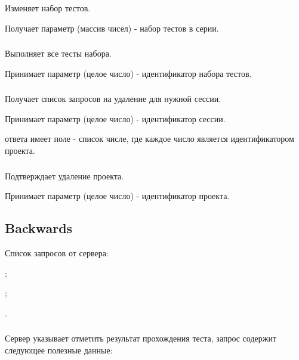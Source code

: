 Изменяет набор тестов.

Получает параметр  (массив чисел) - набор тестов в серии.

\subsubsection{}

Выполняет все тесты набора.

Принимает параметр  (целое число) - идентификатор набора тестов.

\subsubsection{}

Получает список запросов на удаление для нужной сессии.

Принимает параметр  (целое число) - идентификатор сессии.

 ответа имеет поле  - список числе, где каждое число является идентификатором проекта.

\subsubsection{}

Подтверждает удаление проекта.

Принимает параметр  (целое число) - идентификатор проекта.

\subsection{Backwards}

Список запросов от сервера:

\begin{icItems}
	\item {};
	\item {};
	\item {}.
\end{icItems}

\subsubsection{}

Сервер указывает отметить результат прохождения теста, запрос содержит следующее полезные данные:

